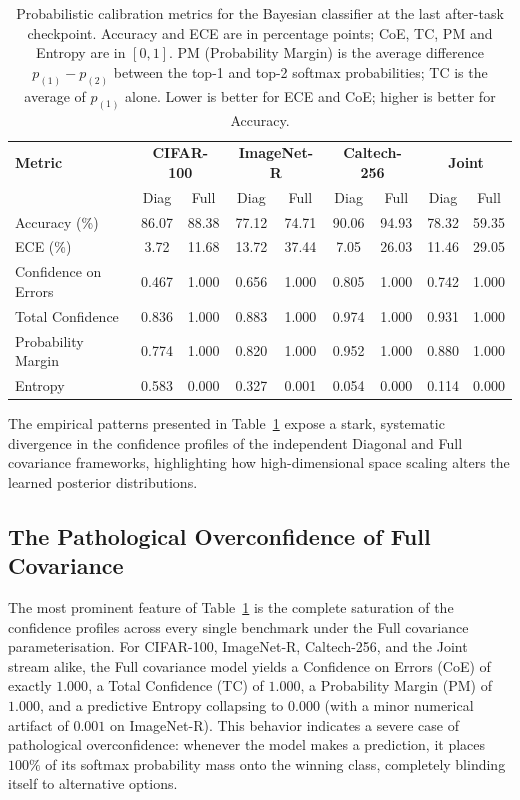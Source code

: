\begin{table}[htbp]
	\centering
	\caption{Probabilistic calibration metrics for the Bayesian classifier at the last after-task checkpoint. Accuracy and ECE are in percentage points; CoE, TC, PM and Entropy are in $[0,1]$. PM (Probability Margin) is the average difference $p_{(1)}-p_{(2)}$ between the top-1 and top-2 softmax probabilities; TC is the average of $p_{(1)}$ alone. Lower is better for ECE and CoE; higher is better for Accuracy.}
	\label{tab:calibration_metrics}
	\scriptsize
	\setlength{\tabcolsep}{3pt}
	\begin{tabular}{l|cc|cc|cc|cc}
		\toprule
		\textbf{Metric} & \multicolumn{2}{c|}{\textbf{CIFAR-100}} & \multicolumn{2}{c|}{\textbf{ImageNet-R}} & \multicolumn{2}{c|}{\textbf{Caltech-256}} & \multicolumn{2}{c}{\textbf{Joint}} \\
		                & Diag & Full & Diag & Full & Diag & Full & Diag & Full \\
		\midrule
		Accuracy (\%)        & 86.07 & 88.38 & 77.12 & 74.71 & 90.06 & 94.93 & 78.32 & 59.35 \\
		ECE (\%)             & 3.72  & 11.68 & 13.72 & 37.44 & 7.05  & 26.03 & 11.46 & 29.05 \\
		Confidence on Errors & 0.467 & 1.000 & 0.656 & 1.000 & 0.805 & 1.000 & 0.742 & 1.000 \\
		Total Confidence     & 0.836 & 1.000 & 0.883 & 1.000 & 0.974 & 1.000 & 0.931 & 1.000 \\
		Probability Margin   & 0.774 & 1.000 & 0.820 & 1.000 & 0.952 & 1.000 & 0.880 & 1.000 \\
		Entropy              & 0.583 & 0.000 & 0.327 & 0.001 & 0.054 & 0.000 & 0.114 & 0.000 \\
		\bottomrule
	\end{tabular}
\end{table}

The empirical patterns presented in Table~\ref{tab:calibration_metrics} expose a stark, systematic divergence in the confidence profiles of the independent Diagonal and Full covariance frameworks, highlighting how high-dimensional space scaling alters the learned posterior distributions.

\subsection{The Pathological Overconfidence of Full Covariance}
\label{sec:calibration:full_pathology}

The most prominent feature of Table~\ref{tab:calibration_metrics} is the complete saturation of the confidence profiles across every single benchmark under the Full covariance parameterisation. For CIFAR-100, ImageNet-R, Caltech-256, and the Joint stream alike, the Full covariance model yields a Confidence on Errors (CoE) of exactly $1.000$, a Total Confidence (TC) of $1.000$, a Probability Margin (PM) of $1.000$, and a predictive Entropy collapsing to $0.000$ (with a minor numerical artifact of $0.001$ on ImageNet-R). This behavior indicates a severe case of pathological overconfidence: whenever the model makes a prediction, it places $100\%$ of its softmax probability mass onto the winning class, completely blinding itself to alternative options.

